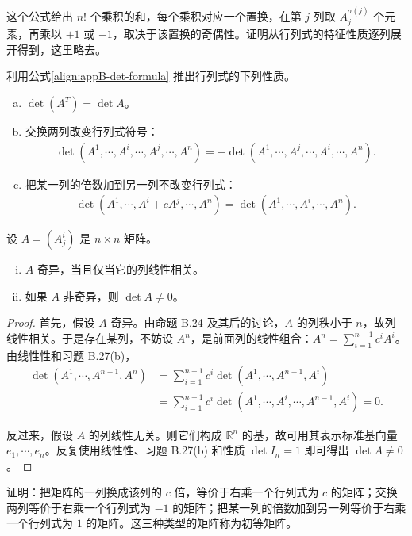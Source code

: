 \documentclass[../../main.tex]{subfiles}
\begin{document}
这个公式给出 $n!$ 个乘积的和，每个乘积对应一个置换，在第 $j$ 列取 $A^{\sigma(j)}_j$ 个元素，再乘以 $+1$ 或 $-1$，取决于该置换的奇偶性。证明从行列式的特征性质逐列展开得到，这里略去。

\begin{exercise}\label{exercise:appB-B-27}
利用公式\eqref{align:appB-det-formula} 推出行列式的下列性质。
\begin{enumerate}[(a)]
\item $\det(A^T)=\det A$。
\item 交换两列改变行列式符号：
\begin{align*}
\det(A^1,\cdots ,A^i,\cdots ,A^j,\cdots ,A^n)
=-\det(A^1,\cdots ,A^j,\cdots ,A^i,\cdots ,A^n).
\end{align*}
\item 把某一列的倍数加到另一列不改变行列式：
\begin{align*}
\det(A^1,\cdots ,A^i+cA^j,\cdots ,A^n)=\det(A^1,\cdots ,A^i,\cdots ,A^n).
\end{align*}
\end{enumerate}
\end{exercise}

\begin{proposition}\label{proposition:appB-determinant-conditions}
设 $A=(A^i_j)$ 是 $n\times n$ 矩阵。
\begin{enumerate}[(i)]
\item $A$ 奇异，当且仅当它的列线性相关。
\item 如果 $A$ 非奇异，则 $\det A\neq0$。
\end{enumerate}
\end{proposition}

\begin{proof}
首先，假设 $A$ 奇异。由命题 B.24 及其后的讨论，$A$ 的列秩小于 $n$，故列线性相关。于是存在某列，不妨设 $A^n$，是前面列的线性组合：$A^n=\sum_{i=1}^{n-1}c^iA^i$。由线性性和习题 B.27(b)，
\begin{align*}
\det(A^1,\cdots ,A^{n-1},A^n)
&=\sum_{i=1}^{n-1}c^i\det(A^1,\cdots ,A^{n-1},A^i)\\
&=\sum_{i=1}^{n-1}c^i\det(A^1,\cdots ,A^i,\cdots ,A^{n-1},A^i)=0.
\end{align*}

反过来，假设 $A$ 的列线性无关。则它们构成 $\mathbb R^n$ 的基，故可用其表示标准基向量 $e_1,\cdots ,e_n$。反复使用线性性、习题 B.27(b) 和性质 $\det I_n=1$ 即可得出 $\det A\neq0$。
\end{proof}

\begin{exercise}\label{exercise:appB-B-29}
证明：把矩阵的一列换成该列的 $c$ 倍，等价于右乘一个行列式为 $c$ 的矩阵；交换两列等价于右乘一个行列式为 $-1$ 的矩阵；把某一列的倍数加到另一列等价于右乘一个行列式为 $1$ 的矩阵。这三种类型的矩阵称为初等矩阵。
\end{exercise}
\end{document}

